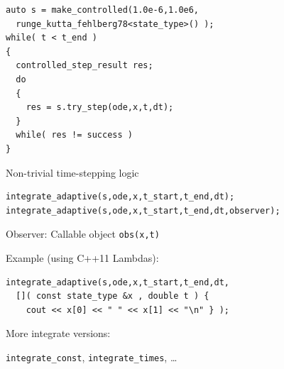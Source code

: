 \begin{frame}[fragile]


\vspace{2ex}

\begin{lstlisting}
auto s = make_controlled(1.0e-6,1.0e6,
  runge_kutta_fehlberg78<state_type>() );
while( t < t_end )
{
  controlled_step_result res;
  do
  { 
    res = s.try_step(ode,x,t,dt);
  }
  while( res != success )
}
\end{lstlisting}

\centerline{Non-trivial time-stepping logic}

\end{frame}


\begin{frame}[fragile]


\vspace{2ex}


\begin{lstlisting}
integrate_adaptive(s,ode,x,t_start,t_end,dt); 
integrate_adaptive(s,ode,x,t_start,t_end,dt,observer);
\end{lstlisting}

Observer: Callable object {\tt obs(x,t)}

\vspace{4ex}
Example (using C++11 Lambdas):
\begin{lstlisting}
integrate_adaptive(s,ode,x,t_start,t_end,dt,
  []( const state_type &x , double t ) { 
    cout << x[0] << " " << x[1] << "\n" } );
\end{lstlisting}

\vspace{2ex}
More integrate versions:

{\tt integrate\_const}, {\tt integrate\_times}, \dots

\end{frame}



